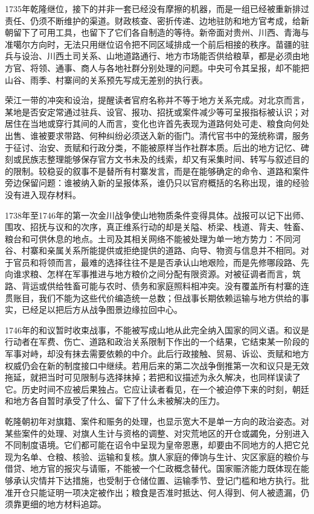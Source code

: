 1735年乾隆继位，接下的并非一套已经没有摩擦的机器，而是一组已经被重新排过责任、仍须不断维护的渠道。财政核查、密折传递、边地驻防和地方官考成，给新朝留下了可用工具，也留下了它们各自制造的等待。新帝面对贵州、川西、青海与准噶尔方向时，无法只用继位诏令把不同区域排成一个前后相接的秩序。苗疆的驻兵与设治、川西土司关系、山地道路通行、地方市场能否供给粮草，都是必须由地方官、将领、通事、商人与各地社群分别处理的问题。中央可令其呈报，却不能把山谷、雨季、村寨间的关系预先写成无差别的执行表。

荣江一带的冲突和设治，提醒读者官府名称并不等于地方关系完成。对北京而言，某地是否安定常通过驻兵、设官、报功、招抚或案件减少等可呈报指标被认识；对居住在当地或穿行其间的人而言，变化也许首先表现为道路何处可走、粮食向何处出售、谁被要求带路、何种纠纷必须送入新的衙门。清代官书中的笼统称谓，服务于征讨、治安、贡赋和行政分类，不能被原样当作社群本质。后出的地方记忆、碑刻或民族志整理能够保存官方文书未及的线索，却又有采集时间、转写与叙述目的的限制。较稳妥的叙事不是替所有村寨发言，而是在能够确定的命令、道路和案件旁边保留问题：谁被纳入新的呈报体系，谁仍只以官府概括的名称出现，谁的经验没有进入现存材料。

1738年至1746年的第一次金川战争使山地物质条件变得具体。战报可以记下出师、围攻、招抚与议和的次序，真正维系行动的却是关隘、桥梁、栈道、背夫、牲畜、粮台和可供休息的地点。土司及其相关网络不能被处理为单一地方势力：不同河谷、村寨和亲属关系所能提供或拒绝提供的道路、向导、物资与信息并不相同。对于官员和将领而言，最难的选择往往不是是否承认山地艰险，而是先修哪段路、先向谁求粮、怎样在军事推进与地方粮价之间分配有限资源。对被征调者而言，筑路、背运或供给牲畜可能与农时、债务和家庭照料相冲突。没有覆盖所有村寨的连贯账目，我们不能为这些代价编造统一总数；但战事长期依赖运输与地方供给的事实，已经足以把后方从战争图景边缘拉回中心。

1746年的和议暂时收束战事，不能被写成山地从此完全纳入国家的同义语。和议是行动者在军费、伤亡、道路和政治关系限制下作出的一个结果，它结束某一阶段的军事对峙，却没有抹去需要依赖的中介。此后行政接触、贸易、诉讼、贡赋和地方权威仍会在新的制度接口中继续。若用后来的第二次战争倒推第一次和议只是无效拖延，就把当时可见限制与选择抹掉；若把和议描述为永久解决，也同样误读了它。历史时间不应被后果独占。它应让读者看见，在一个被迫停下来的时刻，朝廷和地方各自暂时承受了什么、留下了什么未被解决的压力。

乾隆朝初年对旗籍、案件和赈务的处理，也显示宽大不是单一方向的政治姿态。对某些案件的处理、对旗人生计与资格的调整、对灾荒地区的开仓或蠲免，分别进入不同制度语境。它们都可能在诏令中呈现为皇帝恩惠，却要由不同地方的人把它兑现为名单、仓粮、核验、运输和复核。旗人家庭的俸饷与生计、灾区家庭的粮价与借贷、地方官的报灾与请赈，不能被一个仁政概念替代。国家赈济能力既体现在能够承认灾情并下达措施，也受制于仓储位置、运输季节、登记门槛和地方执行。批准开仓只能证明一项决定被作出；粮食是否准时抵达、何人得到、何人被遗漏，仍须靠更细的地方材料追踪。

